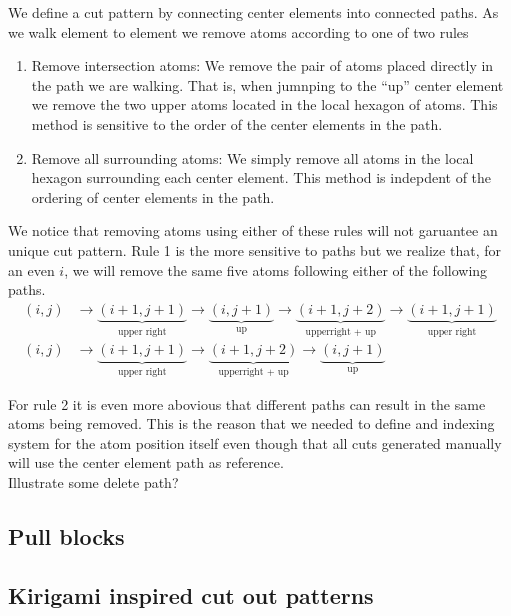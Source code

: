We define a cut pattern by connecting center elements into connected paths. As we walk element to element we remove atoms according to one of two rules 
\begin{enumerate}
  \item Remove intersection atoms: We remove the pair of atoms placed directly in the path we are walking. That is, when jumnping to the ``up'' center element we remove the two upper atoms located in the local hexagon of atoms. This method is sensitive to the order of the center elements in the path. 
  \item Remove all surrounding atoms: We simply remove all atoms in the local hexagon surrounding each center element. This method is indepdent of the ordering of center elements in the path.
\end{enumerate}

We notice that removing atoms using either of these rules will not garuantee an unique cut pattern. Rule 1 is the more sensitive to paths but we realize that, for an even $i$, we will remove the same five atoms following either of the following paths.
\begin{align*}
  (i, j) &\rightarrow \underbrace{(i+1,j+1)}_{\text{upper right}} \rightarrow \underbrace{(i, j+1)}_{\text{up}} \rightarrow \underbrace{(i+1, j+2)}_{\text{upperright + up}} \rightarrow \underbrace{(i+1, j+1)}_{\text{upper right}} \\
  (i, j) &\rightarrow \underbrace{(i+1,j+1)}_{\text{upper right}} \rightarrow \underbrace{(i+1, j+2)}_{\text{upperright + up}} \rightarrow \underbrace{(i, j+1)}_{\text{up}}
\end{align*}

For rule 2 it is even more abovious that different paths can result in the same atoms being removed. This is the reason that we needed to define and indexing system for the atom position itself even though that all cuts generated manually will use the center element path as reference. \\

Illustrate some delete path?




\subsection{Pull blocks}

\subsection{Kirigami inspired cut out patterns}
